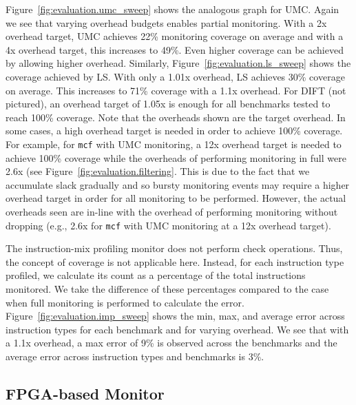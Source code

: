 Figure~\ref{fig:evaluation.umc_sweep} shows the analogous graph for UMC. Again
we see that varying overhead budgets enables partial monitoring.
With a 2x overhead target, UMC achieves 22\% monitoring coverage on average and with a 4x overhead target, this increases to 49\%.
Even higher coverage can be achieved by allowing higher overhead.
Similarly, Figure~\ref{fig:evaluation.ls_sweep} shows the coverage achieved by LS.
With only a 1.01x overhead, LS achieves 30\% coverage on average. This increases to
71\% coverage with a 1.1x overhead. 
For DIFT (not pictured), an overhead target of 1.05x is enough for
all benchmarks tested to reach 100\% coverage.
Note that the overheads shown are the target overhead. In some cases, a high
overhead target is needed in order to achieve 100\% coverage. For example, for
{\tt mcf} with UMC monitoring, a 12x overhead target is needed to achieve 100\%
coverage while the overheads of performing monitoring in full were 2.6x (see
Figure~\ref{fig:evaluation.filtering}. This is due to the fact that we
accumulate slack gradually and so bursty monitoring events may require a higher
overhead target in order for all monitoring to be performed. However, the
actual overheads seen are in-line with the overhead of performing monitoring
without dropping (e.g., 2.6x for {\tt mcf} with UMC monitoring at a 12x
overhead target).


The instruction-mix profiling monitor does not perform check operations. Thus,
the concept of coverage is not applicable here. Instead, for each instruction
type profiled, we calculate its count as a percentage of the total instructions
monitored. We take the difference of these percentages compared to the case
when full monitoring
is performed to calculate the error. Figure~\ref{fig:evaluation.imp_sweep}
shows the min, max, and average error across
instruction types for each benchmark and for varying overhead. We see that
with a 1.1x overhead, a max error of 9\% is observed across the benchmarks and the
average error across instruction types and benchmarks is 3\%. 

\subsection{FPGA-based Monitor}
\label{sec:evaluation.fpga}

